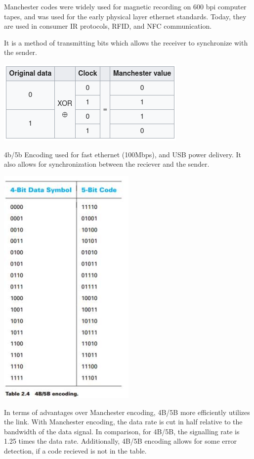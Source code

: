 Manchester codes were widely used for magnetic recording on 600 bpi computer
tapes, and was used for the early physical layer ethernet standards.
Today, they are used in consumer IR protocols, RFID, and NFC communication.

It is a method of transmitting bits which allows the receiver to synchronize
with the sender.\footnotemark



\includegraphics*[width=\textwidth]{manchester.png}

4b/5b Encoding used for fast ethernet (100Mbps), and USB power delivery. It also
allows for synchronization between the reciever and the sender.\footnotemark
{}

\includegraphics*[width=0.5\textwidth]{4b5b.jpg}




In terms of advantages over Manchester encoding, 4B/5B more efficiently utilizes
the link. With Manchester encoding, the data rate is cut in half relative to the
bandwidth of the data signal.  In comparison, for 4B/5B, the signalling rate is
1.25 times the data rate. Additionally, 4B/5B encoding allows for some error
detection, if a code recieved is not in the table.
